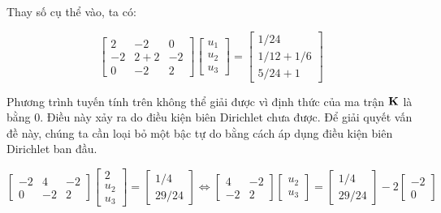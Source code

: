 Thay số cụ thể vào, ta có:

\begin{equation}
    \begin{bmatrix}
        2 & -2 & 0\\
        -2 & 2+2 & -2 \\
        0 & -2 & 2
    \end{bmatrix}\begin{bmatrix}
        u_1 \\ u_2 \\ u_3
    \end{bmatrix} = \begin{bmatrix}
        1/24 \\ 1/12 + 1/6 \\ 5/24 + 1
    \end{bmatrix}
\end{equation}

Phương trình tuyến tính trên không thể giải được vì định thức của ma trận ${\bf K}$ là bằng 0. Điều này xảy ra do điều kiện biên Dirichlet chưa được. Để giải quyết vấn đề này, chúng ta cần loại bỏ một bậc tự do bằng cách áp dụng điều kiện biên Dirichlet ban đầu.

\begin{equation}
    \begin{bmatrix}
        -2 & 4 & -2 \\
        0 & -2 & 2
    \end{bmatrix}\begin{bmatrix}
        2 \\ u_2 \\ u_3
    \end{bmatrix} = \begin{bmatrix}
        1/4 \\ 29/24
    \end{bmatrix} \Leftrightarrow \begin{bmatrix}
        4 & -2 \\
        -2 & 2
    \end{bmatrix}\begin{bmatrix}
        u_2 \\ u_3
    \end{bmatrix} = \begin{bmatrix}
        1/4 \\ 29/24
    \end{bmatrix} - 2\begin{bmatrix}
        -2 \\ 0
    \end{bmatrix}
\end{equation}

